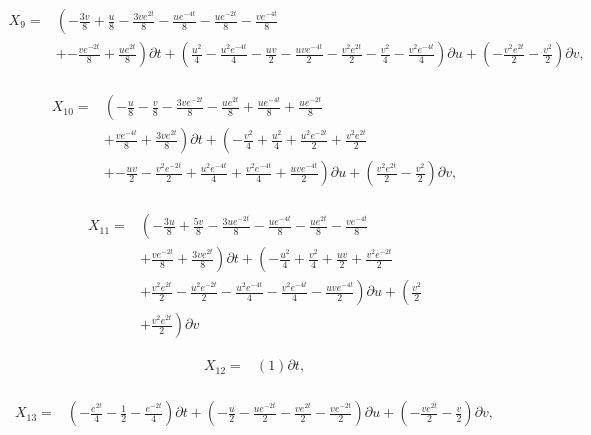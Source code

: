 \begin{align*}
X_{9}=&\left(- \frac{3 v}{8}+\frac{u}{8}- \frac{3 v e^{2 t}}{8}- \frac{u e^{- 4 t}}{8}- \frac{u e^{- 2 t}}{8}- \frac{v e^{- 4 t}}{8}\right.\\
&+\left.- \frac{v e^{- 2 t}}{8}+\frac{u e^{2 t}}{8} \right)\partial t+\left(\frac{u^{2}}{4} - \frac{u^{2} e^{- 4 t}}{4} - \frac{u v}{2} - \frac{u v e^{- 4 t}}{2} - \frac{v^{2} e^{2 t}}{2} - \frac{v^{2}}{4} - \frac{v^{2} e^{- 4 t}}{4} \right)\partial u+\left(- \frac{v^{2} e^{2 t}}{2} - \frac{v^{2}}{2} \right)\partial v,\\
\end{align*}

\begin{align*}
X_{10}=&\left(- \frac{u}{8}- \frac{v}{8}- \frac{3 v e^{- 2 t}}{8}- \frac{u e^{2 t}}{8}+\frac{u e^{- 4 t}}{8}+\frac{u e^{- 2 t}}{8}\right.\\
&+\left.\frac{v e^{- 4 t}}{8}+\frac{3 v e^{2 t}}{8} \right)\partial t+\left(- \frac{v^{2}}{4}+\frac{u^{2}}{4}+\frac{u^{2} e^{- 2 t}}{2}+\frac{v^{2} e^{2 t}}{2}\right.\\
&+\left.- \frac{u v}{2}- \frac{v^{2} e^{- 2 t}}{2}+\frac{u^{2} e^{- 4 t}}{4}+\frac{v^{2} e^{- 4 t}}{4}+\frac{u v e^{- 4 t}}{2} \right)\partial u+\left(\frac{v^{2} e^{2 t}}{2} - \frac{v^{2}}{2} \right)\partial v,\\
\end{align*}

\begin{align*}
X_{11}=&\left(- \frac{3 u}{8}+\frac{5 v}{8}- \frac{3 u e^{- 2 t}}{8}- \frac{u e^{- 4 t}}{8}- \frac{u e^{2 t}}{8}- \frac{v e^{- 4 t}}{8}\right.\\
&+\left.\frac{v e^{- 2 t}}{8}+\frac{3 v e^{2 t}}{8} \right)\partial t+\left(- \frac{u^{2}}{4}+\frac{v^{2}}{4}+\frac{u v}{2}+\frac{v^{2} e^{- 2 t}}{2}\right.\\
&+\left.\frac{v^{2} e^{2 t}}{2}- \frac{u^{2} e^{- 2 t}}{2}- \frac{u^{2} e^{- 4 t}}{4}- \frac{v^{2} e^{- 4 t}}{4}- \frac{u v e^{- 4 t}}{2} \right)\partial u+\left(\frac{v^{2}}{2}\right.\\
&+\left.\frac{v^{2} e^{2 t}}{2} \right)\partial v
\end{align*}

\begin{align*}
X_{12}=&\left(1 \right)\partial t,\\
\end{align*}

\begin{align*}
X_{13}=&\left(- \frac{e^{2 t}}{4} - \frac{1}{2} - \frac{e^{- 2 t}}{4} \right)\partial t+\left(- \frac{u}{2} - \frac{u e^{- 2 t}}{2} - \frac{v e^{2 t}}{2} - \frac{v e^{- 2 t}}{2} \right)\partial u+\left(- \frac{v e^{2 t}}{2} - \frac{v}{2} \right)\partial v,\\
\end{align*}

